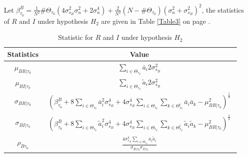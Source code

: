 Let $\beta_{\tau_0}^B = \frac{1}{N^2}\#\Theta_{\tau_0}(4\sigma_{s_B}^2\sigma_n^2+2\sigma_n^4) + \frac{2}{N^2}(N - \#\Theta_{\tau_0})(\sigma_n^2+\sigma_{s_B}^2)^2$, 
the statistics of $R$ and $I$ under hypothesis $H_2$ are given in Table \ref{Table3} on page \pageref{Table3}. 
\begin{table}[h]
\centering
  \begin{tabular}{|c|c|}
	\hline
	Statistics          & Value                                                                                                                                                                                                                 \\ \hline
	$\mu_{BR|\tau_0}$    & $\displaystyle{\sum_{i\in\Theta_{\tau_0}}\bar{a}_i2\sigma_{s_B}^2}$                                                                                                                                                                      \\ \hline
    $\mu_{BI|\tau_0}$    & $\displaystyle{\sum_{i\in\Theta_{\tau_0}}\tilde{a}_i2\sigma_{s_B}^2}$                                                                                                                                                                           \\ \hline
    $\sigma_{BR|\tau_0}$ & $\displaystyle{\left(\beta_{\tau_0}^B+8\sum_{i\in\Theta_{\tau_0}}\bar{a}_i^2\sigma_{s_B}^4 + 4\sigma_{s_B}^4\sum_{i\in\Theta_{\tau_0}}\sum_{k\in\Theta_{\tau_0}^i}\bar{a}_i\bar{a}_k- \mu_{BR|\tau_0}^2 \right)^\frac{1}{2}}$  \\ \hline
    $\sigma_{BI|\tau_0}$ & 
    $\begin{array} {l} \displaystyle{\left(\beta_{\tau_0}^B +8\sum_{i\in\Theta_{\tau_0}}\tilde{a}_i^2\sigma_{s_B}^4 +4\sigma_{s_B}^4\sum_{i\in\Theta_{\tau_0}}\sum_{k\in\Theta_{\tau_0}^i}\tilde{a}_i\tilde{a}_k- \mu_{BR|\tau_0}^2\right)^\frac{1}{2}}\end{array}$ 
    \\ \hline
	$\rho_{B\tau_0}$    & $ \displaystyle{\frac{4\sigma_{s_A}^4\sum_{i\in\Theta_{\tau_0}}\bar{a}_i\tilde{a}_i}{\sigma_{R|\tau_0}\sigma_{I|\tau_0}}}$                                                                            \\ \hline
  \end{tabular}
  \caption{Statistic for $R$ and $I$ under hypothesis $H_2$}
  \label{Table2}
\end{table}

